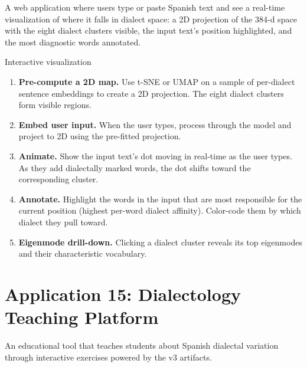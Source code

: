 \documentclass[11pt,a4paper]{article}
\begin{document}
\begin{appbox}
A web application where users type or paste Spanish text and see a
real-time visualization of where it falls in dialect space: a 2D
projection of the 384-d space with the eight dialect clusters visible,
the input text's position highlighted, and the most diagnostic words
annotated.
\end{appbox}

\begin{howbox}{Interactive visualization}
\begin{enumerate}[nosep]
  \item \textbf{Pre-compute a 2D map.} Use t-SNE or UMAP on a
    sample of per-dialect sentence embeddings to create a 2D
    projection. The eight dialect clusters form visible regions.

  \item \textbf{Embed user input.} When the user types, process
    through the model and project to 2D using the pre-fitted
    projection.

  \item \textbf{Animate.} Show the input text's dot moving in
    real-time as the user types. As they add dialectally marked
    words, the dot shifts toward the corresponding cluster.

  \item \textbf{Annotate.} Highlight the words in the input that
    are most responsible for the current position (highest per-word
    dialect affinity). Color-code them by which dialect they pull
    toward.

  \item \textbf{Eigenmode drill-down.} Clicking a dialect cluster
    reveals its top eigenmodes and their characteristic vocabulary.
\end{enumerate}
\end{howbox}

\section{Application 15: Dialectology Teaching Platform}
\label{sec:app-teaching}

\begin{appbox}
An educational tool that teaches students about Spanish dialectal
variation through interactive exercises powered by the v3 artifacts.
\end{appbox}
\end{document}
